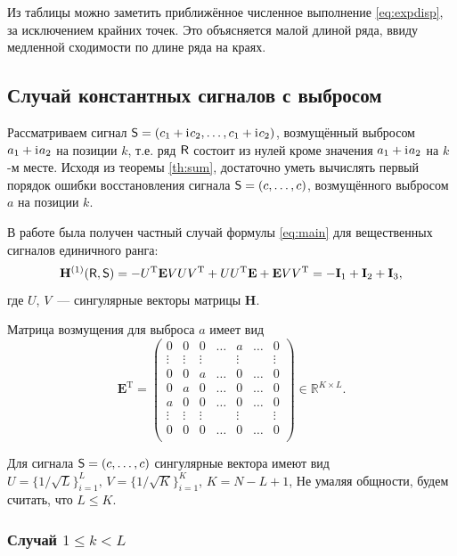 \documentclass[specialist,
               substylefile = spbu.rtx,
               subf,href,colorlinks=true, 12pt]{disser}
\begin{document}
Из таблицы можно заметить приближённое численное выполнение \eqref{eq:expdisp}, за исключением крайних точек. Это объясняется малой длиной ряда, ввиду медленной сходимости по длине ряда на краях.

\subsection{Случай константных сигналов с выбросом}
Рассматриваем сигнал $\textsf{S} = (c_1 + \mathrm{i}\mkern1mu c_2, \ldots, c_1 + \mathrm{i}\mkern1mu c_2)$, возмущённый выбросом $a_1 + \mathrm{i}\mkern1mu a_2$ на позиции $k$, т.е. ряд $\textsf{R}$ состоит из нулей кроме значения $a_1 + \mathrm{i}\mkern1mu a_2$ на $k$-м месте. Исходя из теоремы \ref{th:sum}, достаточно уметь вычислять первый порядок ошибки восстановления сигнала $\textsf{S} = (c, \ldots, c)$, возмущённого выбросом $a$ на позиции $k$.

В работе \cite{Nekr2008} была получен частный случай формулы \eqref{eq:main} для вещественных сигналов единичного ранга:
\begin{equation} \label{eq:real_rk1}
\mathbf{H}^{(1)}(\textsf{R}, \textsf{S}) = -U^{\mathrm{T}} \mathbf{E} V U V^{\mathrm{T}} + U U^{\mathrm{T}} \mathbf{E} + \mathbf{E} V V^{\mathrm{T}} = -\mathbf{I}_1 + \mathbf{I}_2 + \mathbf{I}_3,
\end{equation}
где $U$, $V$~--- сингулярные векторы матрицы $\mathbf{H}$.

Матрица возмущения для выброса $a$ имеет вид
$$\mathbf{E}^{\mathrm{T}} = \begin{pmatrix}
	0 & 0 & 0 & \ldots &  a  & \ldots & 0\\
	 \vdots &\vdots & \vdots & &  \vdots & & \vdots\\
	0 & 0 & a & \ldots & 0 & \ldots & 0\\
	0 & a & 0 & \ldots & 0 & \ldots & 0\\
	a & 0 & 0 & \ldots & 0 & \ldots & 0\\
	\vdots &\vdots & \vdots & & \vdots & & \vdots\\
	0 & 0 & 0 & \ldots & 0 & \ldots & 0\\
\end{pmatrix} \in \mathbb{R}^{K \times L}.$$

Для сигнала $\textsf{S} = (c, \ldots, c)$ сингулярные вектора имеют вид
$U = \{1/\sqrt{L}\}^{L}_{i = 1},\, V = \{1/\sqrt{K}\}^{K}_{i = 1}$, $K = N - L + 1$,
Не умаляя общности, будем считать, что $L \leq K$.

\subsubsection{Случай $1 \leq k < L$}
\end{document}
